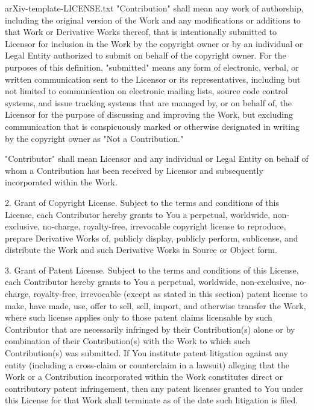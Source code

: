 \begin{filecontents*}{arXiv-template-LICENSE.txt}
      "Contribution" shall mean any work of authorship, including
      the original version of the Work and any modifications or additions
      to that Work or Derivative Works thereof, that is intentionally
      submitted to Licensor for inclusion in the Work by the copyright owner
      or by an individual or Legal Entity authorized to submit on behalf of
      the copyright owner. For the purposes of this definition, "submitted"
      means any form of electronic, verbal, or written communication sent
      to the Licensor or its representatives, including but not limited to
      communication on electronic mailing lists, source code control systems,
      and issue tracking systems that are managed by, or on behalf of, the
      Licensor for the purpose of discussing and improving the Work, but
      excluding communication that is conspicuously marked or otherwise
      designated in writing by the copyright owner as "Not a Contribution."

      "Contributor" shall mean Licensor and any individual or Legal Entity
      on behalf of whom a Contribution has been received by Licensor and
      subsequently incorporated within the Work.

   2. Grant of Copyright License. Subject to the terms and conditions of
      this License, each Contributor hereby grants to You a perpetual,
      worldwide, non-exclusive, no-charge, royalty-free, irrevocable
      copyright license to reproduce, prepare Derivative Works of,
      publicly display, publicly perform, sublicense, and distribute the
      Work and such Derivative Works in Source or Object form.

   3. Grant of Patent License. Subject to the terms and conditions of
      this License, each Contributor hereby grants to You a perpetual,
      worldwide, non-exclusive, no-charge, royalty-free, irrevocable
      (except as stated in this section) patent license to make, have made,
      use, offer to sell, sell, import, and otherwise transfer the Work,
      where such license applies only to those patent claims licensable
      by such Contributor that are necessarily infringed by their
      Contribution(s) alone or by combination of their Contribution(s)
      with the Work to which such Contribution(s) was submitted. If You
      institute patent litigation against any entity (including a
      cross-claim or counterclaim in a lawsuit) alleging that the Work
      or a Contribution incorporated within the Work constitutes direct
      or contributory patent infringement, then any patent licenses
      granted to You under this License for that Work shall terminate
      as of the date such litigation is filed.


\end{filecontents*}
